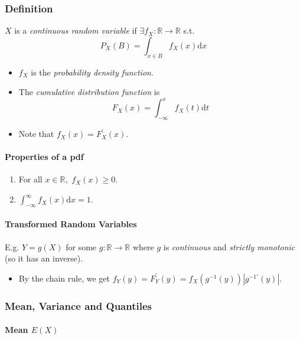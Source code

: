 \documentclass[twocolumn,english]{article}
\begin{document}
\subsubsection{Definition}

$X$ is a \emph{continuous random variable} if $\exists f_{X}:\mathbb{R}\rightarrow\mathbb{R}$
s.t.
\[
P_{X}\left(B\right)=\int_{x\in B}f_{X}\left(x\right)\text{d}x
\]
\begin{itemize}
\item $f_{X}$ is the \emph{probability density function}.
\item The \emph{cumulative distribution function} is
\[
F_{X}\left(x\right)=\int_{-\infty}^{x}f_{X}\left(t\right)\text{d}t
\]
\item Note that $f_{X}\left(x\right)=F_{X}^{\prime}\left(x\right)$.
\end{itemize}

\paragraph{Properties of a pdf}
\begin{enumerate}
\item For all $x\in\mathbb{R},$ $f_{X}\left(x\right)\geq0$.
\item $\int_{-\infty}^{\infty}f_{X}\left(x\right)\text{d}x=1$.
\end{enumerate}

\paragraph{Transformed Random Variables}

E.g. $Y=g\left(X\right)$ for some $g:\mathbb{R}\rightarrow\mathbb{R}$
where $g$ is \emph{continuous} and \emph{strictly monotonic} (so
it has an inverse).
\begin{itemize}
\item By the chain rule, we get $f_{Y}\left(y\right)=F_{Y}^{\prime}\left(y\right)=f_{X}\left(g^{-1}\left(y\right)\right)\left|g^{-1'}\left(y\right)\right|$.
\end{itemize}

\subsubsection{Mean, Variance and Quantiles}

\paragraph{Mean $E\left(X\right)$}
\end{document}
